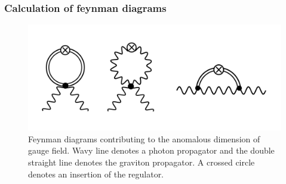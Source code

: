 \documentclass[11pt, a4paper]{article}
\begin{document}





\subsubsection{Calculation of feynman diagrams}
\begin{figure}[H]
    \includegraphics[width=1\textwidth]{./figures/diags.jpg}
    \caption{Feynman diagrams contributing to the anomalous dimension of gauge field. Wavy line denotes a photon propagator
    and the double straight line denotes the graviton propagator. A crossed circle denotes an insertion of the regulator.}
    \label{diags}
\end{figure} 



\end{document}
